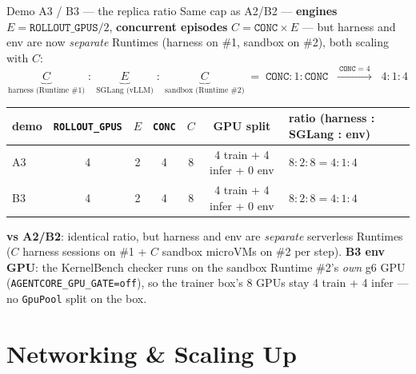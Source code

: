 \documentclass[aspectratio=169]{beamer}
\begin{document}
\begin{frame}{Demo A3 / B3 --- the replica ratio}
  \footnotesize
  Same cap as A2/B2 --- \textbf{engines} $E = \texttt{ROLLOUT\_GPUS}/2$, \textbf{concurrent episodes}
  $C = \texttt{CONC}\times E$ --- but harness and env are now \emph{separate} Runtimes (harness on
  \#1, sandbox on \#2), both scaling with $C$:
  \[ \underbrace{C}_{\text{harness (Runtime \#1)}} \;:\;
     \underbrace{E}_{\text{SGLang (vLLM)}} \;:\;
     \underbrace{C}_{\text{sandbox (Runtime \#2)}} \;=\; \texttt{CONC} : 1 : \texttt{CONC}
     \;\;\xrightarrow{\ \texttt{CONC}=4\ }\;\; 4 : 1 : 4 \]
  \vspace{-0.2em}
  \begin{center}
  \renewcommand{\arraystretch}{1.2}\scriptsize
  \begin{tabular}{lcccccl}
    \toprule
    demo & \texttt{ROLLOUT\_GPUS} & $E$ & \texttt{CONC} & $C$ & GPU split & ratio (harness : SGLang : env) \\
    \midrule
    A3 & 4 & 2 & 4 & 8 & 4 train + 4 infer + 0 env & $8:2:8 = 4:1:4$ \\
    B3 & 4 & 2 & 4 & 8 & 4 train + 4 infer + 0 env & $8:2:8 = 4:1:4$ \\
    \bottomrule
  \end{tabular}
  \end{center}
  \vspace{0.1em}
  {\scriptsize \textbf{vs A2/B2}: identical ratio, but harness and env are \emph{separate} serverless
  Runtimes ($C$ harness sessions on \#1 + $C$ sandbox microVMs on \#2 per step). \textbf{B3 env GPU}:
  the KernelBench checker runs on the sandbox Runtime \#2's \emph{own} g6 GPU (\texttt{AGENTCORE\_GPU\_GATE=off}),
  so the trainer box's 8 GPUs stay 4 train + 4 infer --- no \texttt{GpuPool} split on the box.}
\end{frame}

\section{Networking \& Scaling Up}
\end{document}
